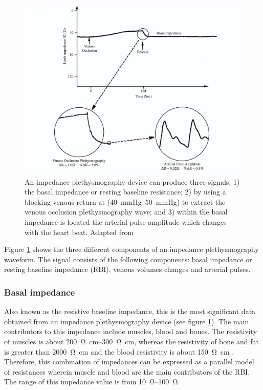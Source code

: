\begin{figure}[!htpb]
	\centering
	\includegraphics[width=\textwidth,keepaspectratio]{figure16}    
	\caption[Signal from an impedance plethysmography device]{An impedance plethysmography device can produce three signals: 1) the basal impedance or resting baseline resistance; 2) by using a blocking venous return at (\SIrange{40}{50}{\mmHg}) to extract the venous occlusion plethysmography wave; and 3) within the basal impedance is located the arterial pulse amplitude which changes with the heart beat. Adapted from \cite{anderson1984impedance}}
	\label{fig:iPG signals}
\end{figure}

Figure \ref{fig:iPG signals} shows the three different components of an impedance plethysmography waveform. The signal consists of the following components: basal impedance or resting baseline impedance (RBI), venous volumes changes and arterial pulses. 

\subsubsection{Basal impedance}
Also known as the resistive baseline impedance, this is the most significant data obtained from an impedance plethysmography device (see figure \ref{fig:iPG signals}). The main contributors to this impedance include muscles, blood and bones. The resistivity of muscles is about \SIrange{200}{300}{\ohm\cm}, whereas the resistivity of bone and fat is greater than \SI{2000}{\ohm\cm} and the blood resistivity is about \SI{150}{\ohm\cm} \cite{gabriel1996dielectric}. Therefore, this combination of impedances can be expressed as a parallel model of resistances wherein muscle and blood are the main contributors of the RBI. The range of this impedance value is from \SIrange{10}{100}{\ohm}. 

